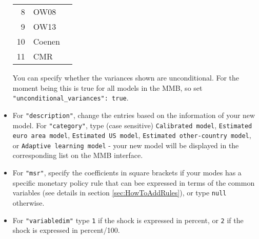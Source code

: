 \begin{itemize}
\begin{table}[H]
\begin{tabular}{rll}
		 8 & OW08 & \cite{OrphanidesWieland2008}\\
		 9 & OW13 & \cite{OrphanidesWieland2013}\\
		 10 & Coenen & \citet{Coenenetal2012}\\
		 11 & CMR & \cite{CMR2014}\\		 
	\end{tabular}
	\end{table}
You can specify whether the variances shown are unconditional. For the moment being this is true for all models in the MMB, so set \texttt{"unconditional\_variances": true}.
\item For \texttt{"description"}, change the entries based on the information of your new model. For \texttt{"category"}, type (case sensitive) \texttt{Calibrated model}, \texttt{Estimated euro area model}, \texttt{Estimated US model}, \texttt{Estimated other-country model}, or \texttt{Adaptive learning model} - your new model will be displayed in the corresponding list on the MMB interface.
\item For \texttt{"msr"}, specify the coefficients in square brackets if your modes has a specific monetary policy rule that can bee expressed in terms of the common variables (see details in section \ref{sec:HowToAddRules}), or type \texttt{null} otherwise.
\item For \texttt{"variabledim"} type \texttt{1} if the shock is expressed in percent, or \texttt{2} if the shock is expressed in percent/100.

\end{itemize}
